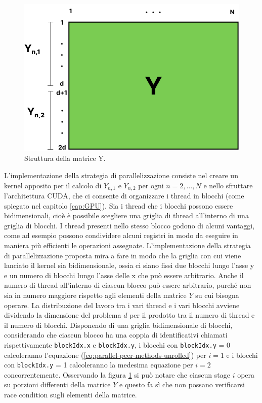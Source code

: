\begin{figure}[ht!]
    \centering
    \includegraphics[scale=0.25]{img/MatrixY075x.png}
    \caption{Struttura della matrice Y.}
    \label{fig:matrixYstructure}
\end{figure}

\noindent L'implementazione della strategia di parallelizzazione consiste nel creare un kernel apposito per il calcolo di $Y_{n,1}$ e $Y_{n,2}$ per ogni $n = 2,\ldots,N$ e nello sfruttare l'architettura CUDA, che ci consente di organizzare i thread in blocchi (come spiegato nel capitolo \ref{cap:GPU}). Sia i thread che i blocchi possono essere bidimensionali, cioè è possibile scegliere una griglia di thread all'interno di una griglia di blocchi. I thread presenti nello stesso blocco godono di alcuni vantaggi, come ad esempio possono condividere alcuni registri in modo da eseguire in maniera più efficienti le operazioni assegnate. L'implementazione della strategia di parallelizzazione proposta mira a fare in modo che la griglia con cui viene lanciato il kernel sia bidimensionale, ossia ci siano fissi due blocchi lungo l'asse y e un numero di blocchi lungo l'asse delle x che può essere arbitrario. Anche il numero di thread all'interno di ciascun blocco può essere arbitrario, purché non sia in numero maggiore rispetto agli elementi della matrice $Y$ su cui bisogna operare. La distribuzione del lavoro tra i vari thread e i vari blocchi avviene dividendo la dimensione del problema $d$ per il prodotto tra il numero di thread e il numero di blocchi. Disponendo di una griglia bidimensionale di blocchi, considerando che ciascun blocco ha una coppia di identificativi chiamati rispettivamente \texttt{blockIdx.x} e \texttt{blockIdx.y}, i blocchi con \texttt{blockIdx.y} = 0 calcoleranno l'equazione (\ref{eq:parallel-peer-methods-unrolled}) per $i = 1$ e i blocchi con \texttt{blockIdx.y} = 1 calcoleranno la medesima equazione per $i = 2$ concorrentemente. Osservando la figura \ref{fig:matrixYstructure} si può notare che ciascun stage $i$ opera su porzioni differenti della matrice $Y$ e questo fa sì che non possano verificarsi race condition sugli elementi della matrice.

